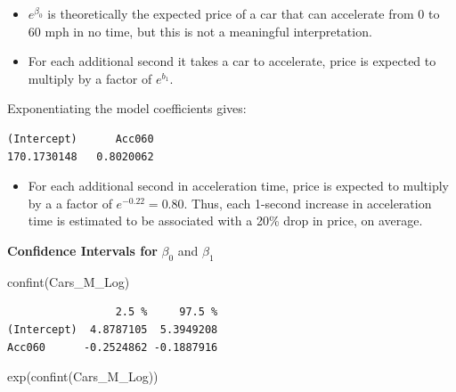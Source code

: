 \documentclass[
  letterpaper,
  DIV=11,
  numbers=noendperiod]{scrreprt}
\newenvironment{Shaded}{\begin{snugshade}}{\end{snugshade}}
\newcommand{\FunctionTok}[1]{\textcolor[rgb]{0.28,0.35,0.67}{#1}}
\newcommand{\NormalTok}[1]{\textcolor[rgb]{0.00,0.23,0.31}{#1}}
\newcommand{\SpecialCharTok}[1]{\textcolor[rgb]{0.37,0.37,0.37}{#1}}
\providecommand{\tightlist}{%
  \setlength{\itemsep}{0pt}\setlength{\parskip}{0pt}}\usepackage{longtable,booktabs,array}
\begin{document}
\begin{itemize}
\item
  \(e^{\beta_0}\) is theoretically the expected price of a car that can
  accelerate from 0 to 60 mph in no time, but this is not a meaningful
  interpretation.
\item
  For each additional second it takes a car to accelerate, price is
  expected to multiply by a factor of \(e^{b_1}\).
\end{itemize}

Exponentiating the model coefficients gives:

\begin{Shaded}
\end{Shaded}

\begin{verbatim}
(Intercept)      Acc060 
170.1730148   0.8020062 
\end{verbatim}

\begin{itemize}
\tightlist
\item
  For each additional second in acceleration time, price is expected to
  multiply by a a factor of \(e^{-0.22} = 0.80\). Thus, each 1-second
  increase in acceleration time is estimated to be associated with a
  20\% drop in price, on average.
\end{itemize}

\textbf{Confidence Intervals for} \(\beta_0\) and \(\beta_1\)

\begin{Shaded}
\begin{Highlighting}[]
\FunctionTok{confint}\NormalTok{(Cars\_M\_Log)}
\end{Highlighting}
\end{Shaded}

\begin{verbatim}
                 2.5 %     97.5 %
(Intercept)  4.8787105  5.3949208
Acc060      -0.2524862 -0.1887916
\end{verbatim}

\begin{Shaded}
\begin{Highlighting}[]
\FunctionTok{exp}\NormalTok{(}\FunctionTok{confint}\NormalTok{(Cars\_M\_Log))}
\end{Highlighting}
\end{Shaded}
\end{document}

